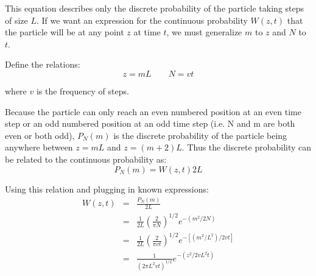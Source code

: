 \documentclass[draft, jgrga]{AGUTeX}
\begin{document}
\begin{article}
This equation describes only the discrete probability of the particle taking steps of size \begin{math} L \end{math}. If we want an expression for the continuous probability \begin{math} W(z,t) \end{math} that the particle will be at any point \begin{math} z \end{math} at time \begin{math} t \end{math}, we must generalize \begin{math} m \end{math} to \begin{math} z \end{math} and \begin{math} N \end{math} to \begin{math} t \end{math}.

Define the relations:
\begin{equation}
z = mL \qquad N = vt
\end{equation}

where \begin{math} v \end{math} is the frequency of steps.

Because the particle can only reach an even numbered position at an even time step or an odd numbered position at an odd time step (i.e. N and m are both even or both odd), \begin{math} P_N(m) \end{math} is the discrete probability of the particle being anywhere between \begin{math} z = mL \end{math} and \begin{math} z = (m+2)L \end{math}. Thus the discrete probability can be related to the continuous probability as:
\begin{equation}
P_N(m) = W(z,t)2L
\end{equation}

Using this relation and plugging in known expressions:
\begin{eqnarray}
W(z,t) & = & \frac{P_N(m)}{2L} \nonumber \\
& = & \frac{1}{2L} \left(\frac{2}{\pi N}\right)^{1/2} e^{-(m^2/2N)} \nonumber \\
& = & \frac{1}{2L} \left(\frac{2}{\pi vt}\right)^{1/2} e^{-[(m^2/L^2)/2vt]} \nonumber \\
& = & \frac{1}{(2 \pi L^2 vt)^{1/2}}e^{-(z^2/2vL^2t)}
\end{eqnarray}


\end{article}
\end{document}

